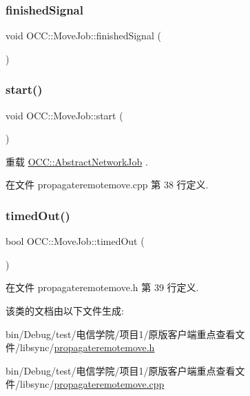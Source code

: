 \subsubsection{\texorpdfstring{finished\+Signal}{finishedSignal}}
{\footnotesize\ttfamily void O\+C\+C\+::\+Move\+Job\+::finished\+Signal (\begin{DoxyParamCaption}{ }\end{DoxyParamCaption})\hspace{0.3cm}{\ttfamily [signal]}}

\mbox{\label{class_o_c_c_1_1_move_job_a0f963be47342b15bed2d961f743d0984}} 
\subsubsection{\texorpdfstring{start()}{start()}}
{\footnotesize\ttfamily void O\+C\+C\+::\+Move\+Job\+::start (\begin{DoxyParamCaption}{ }\end{DoxyParamCaption})\hspace{0.3cm}{\ttfamily [virtual]}}



重载 \hyperlink{class_o_c_c_1_1_abstract_network_job_a256f1b6b5d6f6252e83b3602743da64a}{O\+C\+C\+::\+Abstract\+Network\+Job} .



在文件 propagateremotemove.\+cpp 第 38 行定义.

\mbox{\label{class_o_c_c_1_1_move_job_ae8d108c5175b52a3b2c913172dcfdd08}} 
\subsubsection{\texorpdfstring{timed\+Out()}{timedOut()}}
{\footnotesize\ttfamily bool O\+C\+C\+::\+Move\+Job\+::timed\+Out (\begin{DoxyParamCaption}{ }\end{DoxyParamCaption})}



在文件 propagateremotemove.\+h 第 39 行定义.



该类的文档由以下文件生成\+:\begin{DoxyCompactItemize}
\item 
bin/\+Debug/test/电信学院/项目1/原版客户端重点查看文件/libsync/\hyperlink{propagateremotemove_8h}{propagateremotemove.\+h}\item 
bin/\+Debug/test/电信学院/项目1/原版客户端重点查看文件/libsync/\hyperlink{propagateremotemove_8cpp}{propagateremotemove.\+cpp}\end{DoxyCompactItemize}
